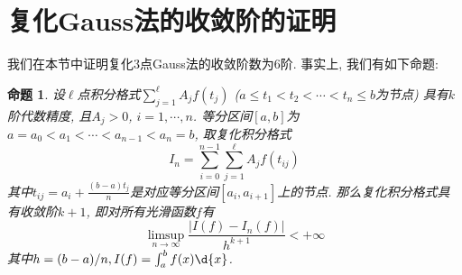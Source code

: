 \documentclass[a4paper]{ctexart}
\theoremstyle{plain}
\newtheorem{prop}{命题}[section]
\theoremstyle{remark}
\numberwithin{equation}{section}
\begin{document}
\section{复化Gauss法的收敛阶的证明}\label{gauss}
我们在本节中证明复化$3$点Gauss法的收敛阶数为$6$阶.
事实上, 我们有如下命题:
\begin{prop}\label{order}
    设$\ell$点积分格式$\sum_{j=1}^\ell A_jf(t_j)$ ($a\leq t_1<t_2<\cdots<t_n\leq b$为节点) 具有$k$阶代数精度, 且$A_j>0$, $i=1,\cdots,n$.
    等分区间$[a,b]$为$a=a_0<a_1<\cdots<a_{n-1}<a_n=b$, 取复化积分格式
    \[I_n=\sum_{i=0}^{n-1}\sum_{j=1}^\ell A_jf(t_{ij})\]
    其中$t_{ij}=a_i+\frac{(b-a)t_j}{n}$是对应等分区间$[a_i,a_{i+1}]$上的节点.
    那么复化积分格式具有收敛阶$k+1$, 即对所有光滑函数$f$有
    \begin{equation}
        \limsup_{n\to\infty}\frac{|I(f)-I_n(f)|}{h^{k+1}}<+\infty\label{A1}
    \end{equation}
    其中$h=(b-a)/n,I(f)=\int_a^bf(x)\d{x}$.
\end{prop}
\end{document}
